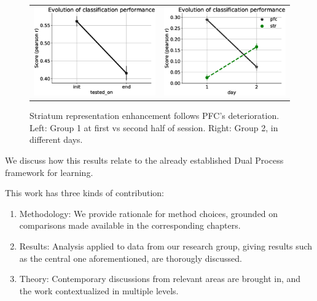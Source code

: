 \begin{figure}
    \centering
    \begin{tabular}{cc}

    \includegraphics[width=7cm]{figures/PFC_init_vs_end.eps}
    & 
    \includegraphics[width=7cm]{figures/STR_PFC_day1_vs_day2_evo.eps}
    \end{tabular}
    
    \caption[Striatum representation enhancement follows PFC's deterioration]{Striatum representation enhancement follows PFC's deterioration. Left: Group 1 at first vs second half of session. Right: Group 2, in different days.}
    \label{fig:time_representation_str_pfc}
\end{figure}

We discuss how this results relate to the already established Dual Process framework for learning.


This work has three kinds of contribution: 
\begin{enumerate}
    \item Methodology: We provide rationale for method choices, grounded on comparisons made available in the corresponding chapters. 
    
    \item Results: Analysis applied to data from our research group, giving results such as the central one aforementioned, are thorougly discussed.
    
    \item Theory: Contemporary discussions from relevant areas are brought in, and the work contextualized in multiple levels.
\end{enumerate}


